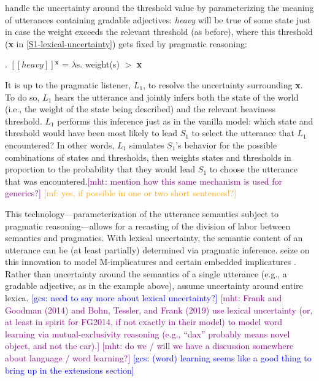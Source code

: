 \documentclass{sp}
\newcommand{\gcs}[1]{\textcolor{blue}{[gcs: #1]}}
\newcommand{\mf}[1]{\textcolor{orange}{[mf: #1]}}
\newcommand{\mht}[1]{\textcolor{purple}{[mht: #1]}}
\newcommand{\lam}{\ensuremath{\lambda}}
\newcommand{\sem}[1]{\ensuremath{[\![#1]\!]}}
\begin{document}
\citeauthor{lassitergoodman2013} handle the uncertainty around the threshold value by parameterizing the meaning of utterances containing gradable adjectives: \emph{heavy} will be true of some state just in case the weight exceeds the relevant threshold (as before), where this threshold (\textbf{x} in \eqref{S1-lexical-uncertainty}) gets fixed by pragmatic reasoning:

\ex. \label{heavy-sem}
\sem{heavy}$^{\textbf{x}}$ = \lam s. weight(s) $>$ \textbf{x}

It is up to the pragmatic listener, $L_1$, to resolve the uncertainty surrounding \textbf{x}. To do so, $L_1$ hears the utterance and jointly infers both the state of the world (i.e., the weight of the state being described) and the relevant heaviness threshold. $L_1$ performs this inference just as in the vanilla model: which state and threshold would have been most likely to lead $S_1$ to select the utterance that $L_1$ encountered? In other words, $L_1$ simulates $S_1$'s behavior for the possible combinations of states and thresholds, then weights states and thresholds in proportion to the probability that they would lead $S_1$ to choose the utterance that was encountered.\mht{mention how this same mechanism is used for generics?} \mf{yes, if possible in one or two short sentences!?}

This technology---parameterization of the utterance semantics subject to pragmatic reasoning---allows for a recasting of the division of labor between semantics and pragmatics. With lexical uncertainty, the semantic content of an utterance can be (at least partially) determined via pragmatic inference. \cite{bergenetal2016} seize on this innovation to model M-implicatures \citep{horn1984} and certain embedded implicatures \citep{hurford1974,chierchiaetal2012}. Rather than uncertainty around the semantics of a single utterance (e.g., a gradable adjective, as in the example above), \citeauthor{bergenetal2016} assume uncertainty around entire lexica. \gcs{need to say more about lexical uncertainty?} \mht{Frank and Goodman (2014) and Bohn, Tessler, and Frank (2019) use lexical uncertainty (or, at least in spirit for FG2014, if not exactly in their model) to model word learning via mutual-exclusivity reasoning (e.g., ``dax'' probably means novel object, and not the car).} \mht{do we / will we have a discussion somewhere about language / word learning?} \gcs{(word) learning seems like a good thing to bring up in the extensions section}
\end{document}
